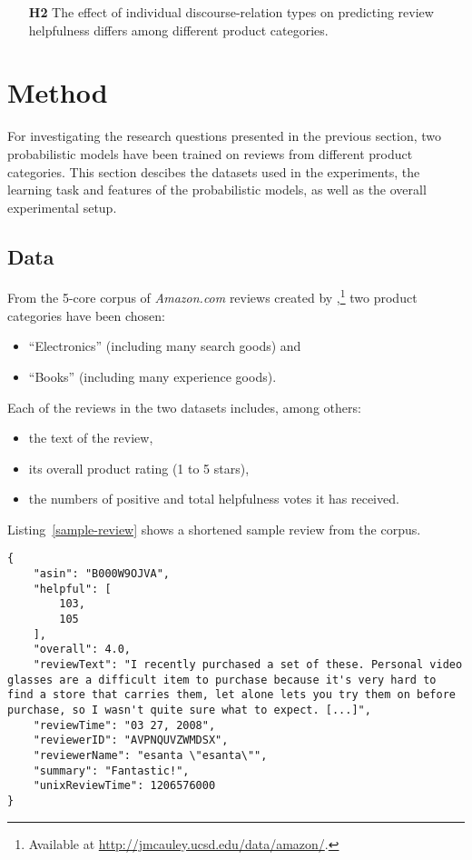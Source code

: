 \documentclass[
    a4paper,%
    12pt,%
    oneside,%
    toc=bibliography,
    final,
]{scrartcl}
\begin{document}
\begin{enumerate}[rightmargin=1cm]
\item[\textbf{H2}] The effect of individual discourse-relation types on predicting review helpfulness differs among different product categories.
\end{enumerate}

\section{Method}
\label{sec:method}

For investigating the research questions presented in the previous section, two probabilistic models have been trained on reviews from different product categories. This section descibes the datasets used in the experiments, the learning task and features of the probabilistic models, as well as the overall experimental setup.

\subsection{Data}

From the 5-core corpus of \textit{Amazon.com} reviews created by \citet{HeMcAuley2016},\footnote{Available at \url{http://jmcauley.ucsd.edu/data/amazon/}.} two product categories have been chosen:

\begin{itemize}
\item “Electronics” (including many search goods) and
\item “Books” (including many experience goods).
\end{itemize}

Each of the reviews in the two datasets includes, among others:

\begin{itemize}
\item the text of the review,
\item its overall product rating (1 to 5 stars),
\item the numbers of positive and total helpfulness votes it has received.
\end{itemize}

Listing~\ref{sample-review} shows a shortened sample review from the corpus.

\begin{lstlisting}[basicstyle=\ttfamily\small\singlespacing, caption=Sample review (shortened) from the “Electronics” category., label=sample-review, float]
{
    "asin": "B000W9OJVA",
    "helpful": [
        103,
        105
    ],
    "overall": 4.0,
    "reviewText": "I recently purchased a set of these. Personal video glasses are a difficult item to purchase because it's very hard to find a store that carries them, let alone lets you try them on before purchase, so I wasn't quite sure what to expect. [...]",
    "reviewTime": "03 27, 2008",
    "reviewerID": "AVPNQUVZWMDSX",
    "reviewerName": "esanta \"esanta\"",
    "summary": "Fantastic!",
    "unixReviewTime": 1206576000
}
\end{lstlisting}
\end{document}
